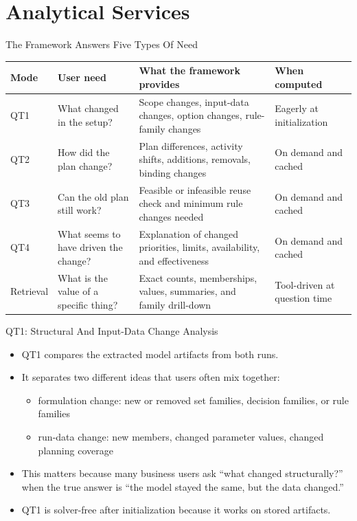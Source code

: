 \documentclass[10pt]{beamer}
\begin{document}
\section{Analytical Services}

\begin{frame}{The Framework Answers Five Types Of Need}
  \scriptsize
  \begin{tabularx}{\textwidth}{>{\raggedright\arraybackslash}p{} >{\raggedright\arraybackslash}p{} X >{\raggedright\arraybackslash}p{}}
    \toprule
    \textbf{Mode} & \textbf{User need} & \textbf{What the framework provides} & \textbf{When computed} \\
    \midrule
    QT1 & What changed in the setup? & Scope changes, input-data changes, option changes, rule-family changes & Eagerly at initialization \\
    QT2 & How did the plan change? & Plan differences, activity shifts, additions, removals, binding changes & On demand and cached \\
    QT3 & Can the old plan still work? & Feasible or infeasible reuse check and minimum rule changes needed & On demand and cached \\
    QT4 & What seems to have driven the change? & Explanation of changed priorities, limits, availability, and effectiveness & On demand and cached \\
    Retrieval & What is the value of a specific thing? & Exact counts, memberships, values, summaries, and family drill-down & Tool-driven at question time \\
    \bottomrule
  \end{tabularx}
\end{frame}

\begin{frame}{QT1: Structural And Input-Data Change Analysis}
  \begin{itemize}
    \item QT1 compares the extracted model artifacts from both runs.
    \item It separates two different ideas that users often mix together:
    \begin{itemize}
      \item formulation change: new or removed set families, decision families, or rule families
      \item run-data change: new members, changed parameter values, changed planning coverage
    \end{itemize}
    \item This matters because many business users ask ``what changed structurally?'' when the true answer is ``the model stayed the same, but the data changed.''
    \item QT1 is solver-free after initialization because it works on stored artifacts.
  \end{itemize}
\end{frame}
\end{document}
